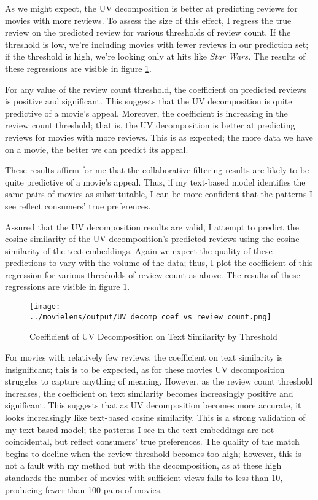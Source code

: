 \documentclass{article}
\begin{document}
As we might expect, the UV decomposition is better at predicting reviews for movies with more reviews. To assess the size of this effect, I regress the true review on the predicted review for various thresholds of review count. If the threshold is low, we're including movies with fewer reviews in our prediction set; if the threshold is high, we're looking only at hits like \emph{Star Wars.} The results of these regressions are visible in figure \ref{fig:uv_threshold}.

For any value of the review count threshold, the coefficient on predicted reviews is positive and significant. This suggests that the UV decomposition is quite predictive of a movie's appeal. Moreover, the coefficient is increasing in the review count threshold; that is, the UV decomposition is better at predicting reviews for movies with more reviews. This is as expected; the more data we have on a movie, the better we can predict its appeal.

These results affirm for me that the collaborative filtering results are likely to be quite predictive of a movie's appeal. Thus, if my text-based model identifies the same pairs of movies as substitutable, I can be more confident that the patterns I see reflect consumers' true preferences. 

Assured that the UV decomposition results are valid, I attempt to predict the cosine similarity of the UV decomposition's predicted reviews using the cosine similarity of the text embeddings. Again we expect the quality of these predictions to vary with the volume of the data; thus, I plot the coefficient of this regression for various thresholds of review count as above. The results of these regressions are visible in figure \ref{fig:uv_threshold}.

\begin{figure}
    \begin{center}
    \texttt{[image: ../movielens/output/UV\_decomp\_coef\_vs\_review\_count.png]}
    \caption{Coefficient of UV Decomposition on Text Similarity by Threshold}
    \label{fig:uv_threshold}
    \end{center}
\end{figure}

For movies with relatively few reviews, the coefficient on text similarity is insignificant; this is to be expected, as for these movies UV decomposition struggles to capture anything of meaning. However, as the review count threshold increases, the coefficient on text similarity becomes increasingly positive and significant. This suggests that as UV decomposition becomes more accurate, it looks increasingly like text-based cosine similarity. This is a strong validation of my text-based model; the patterns I see in the text embeddings are not coincidental, but reflect consumers' true preferences. The quality of the match begins to decline when the review threshold becomes too high; however, this is not a fault with my method but with the decomposition, as at these high standards the number of movies with sufficient views falls to less than 10, producing fewer than 100 pairs of movies. 
\end{document}

